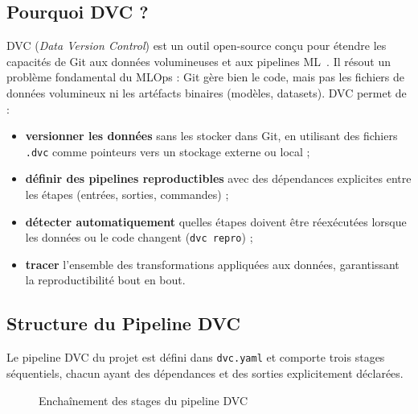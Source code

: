 \documentclass{rapportENSIAS}
\newcommand{\projectpath}[1]{\texttt{#1}}
\begin{document}
\subsection{Pourquoi DVC ?}

DVC (\textit{Data Version Control}) est un outil open-source conçu pour étendre
les capacités de Git aux données volumineuses et aux pipelines ML~\cite{dvc2020}.
Il résout un problème fondamental du MLOps : Git gère bien le code, mais pas les
fichiers de données volumineux ni les artéfacts binaires (modèles, datasets).
DVC permet de :

\begin{itemize}
    \item \textbf{versionner les données} sans les stocker dans Git, en utilisant
          des fichiers \texttt{.dvc} comme pointeurs vers un stockage externe ou local ;
    \item \textbf{définir des pipelines reproductibles} avec des dépendances
          explicites entre les étapes (entrées, sorties, commandes) ;
    \item \textbf{détecter automatiquement} quelles étapes doivent être réexécutées
          lorsque les données ou le code changent (\texttt{dvc repro}) ;
    \item \textbf{tracer} l'ensemble des transformations appliquées aux données,
          garantissant la reproductibilité bout en bout.
\end{itemize}

\subsection{Structure du Pipeline DVC}

Le pipeline DVC du projet est défini dans \projectpath{dvc.yaml} et comporte
trois stages séquentiels, chacun ayant des dépendances et des sorties explicitement
déclarées.

\begin{figure}[H]
\centering
{}
\caption{Enchaînement des stages du pipeline DVC}
\label{fig:dvc_pipeline}
\end{figure}
\end{document}
